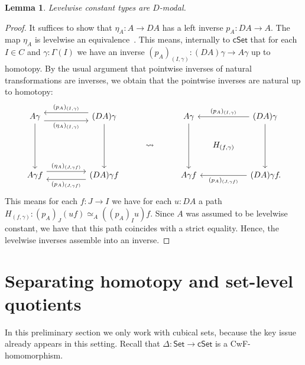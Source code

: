 \documentclass[10pt,a4paper]{article}
\newtheorem{lemma}[theorem]{Lemma}
\theoremstyle{definition}
\theoremstyle{remark}
\newcommand{\Set}{\mathsf{Set}}
\newcommand{\cSet}{\mathsf{cSet}}
\begin{document}
\begin{lemma}\label{prop:levelwise-constant-presheaves-are-modal}
  Levelwise constant types are \(D\)-modal.
\end{lemma}
\begin{proof}
  It suffices to show that \(\eta_A \colon A \to DA\) has a left inverse \(p_A \colon DA \to A\).
  The map \(\eta_A\) is levelwise an equivalence~\cite[Proposition~3.8]{CRS21}.
  This means, internally to \(\cSet\) that for each \(I \in C\) and \(\gamma \colon \Gamma(I)\) we have an inverse \((p_A)_{(I, \gamma)} \colon (DA)\gamma \to A\gamma\) up to homotopy.
  By the usual argument that pointwise inverses of natural transformations are inverses, we obtain that the pointwise inverses are natural up to homotopy:
  \[\begin{tikzcd}
    {A\gamma} && {(DA)\gamma} && {A\gamma} && {(DA)\gamma} \\
    &&& \rightsquigarrow && {\clap{\(H_{(f, \gamma)}\)}} \\
    {A\gamma f} && {(DA)\gamma f} && {A\gamma f} && {(DA)\gamma f\clap{.}}
    \arrow[""{name=0, anchor=center, inner sep=0}, "{(\eta_A)_{(I, \gamma)}}"', shift right=2, from=1-1, to=1-3]
    \arrow[from=1-1, to=3-1]
    \arrow[""{name=1, anchor=center, inner sep=0}, "{(p_A)_{(I, \gamma)}}"', shift right=2, from=1-3, to=1-1]
    \arrow[from=1-3, to=3-3]
    \arrow[from=1-5, to=3-5]
    \arrow["{(p_A)_{(I, \gamma)}}"', from=1-7, to=1-5]
    \arrow[from=1-7, to=3-7]
    \arrow[""{name=2, anchor=center, inner sep=0}, "{(\eta_A)_{(J, \gamma f)}}", shift left=2, from=3-1, to=3-3]
    \arrow[""{name=3, anchor=center, inner sep=0}, "{(p_A)_{(J, \gamma f)}}", shift left=2, from=3-3, to=3-1]
    \arrow["{(p_A)_{(J, \gamma f)}}", from=3-7, to=3-5]
  \end{tikzcd}\]
  This means for each \(f \colon J \to I\) we have for each \(u \colon DA\) a path \(H_{(f, \gamma)} \colon (p_A)_J(uf) \simeq_{A} ((p_A)_Iu)f\).
  Since \(A\) was assumed to be levelwise constant, we have that this path coincides with a strict equality.
  Hence, the levelwise inverses assemble into an inverse.
\end{proof}



\section{Separating homotopy and set-level quotients}\label{sec:cset-homotopy-quotient-vs-meta-quotient}

In this preliminary section we only work with cubical sets, because the key issue already appears in this setting.
Recall that \(\Delta \colon \Set \to \cSet\) is a CwF-homomorphism.
\end{document}
